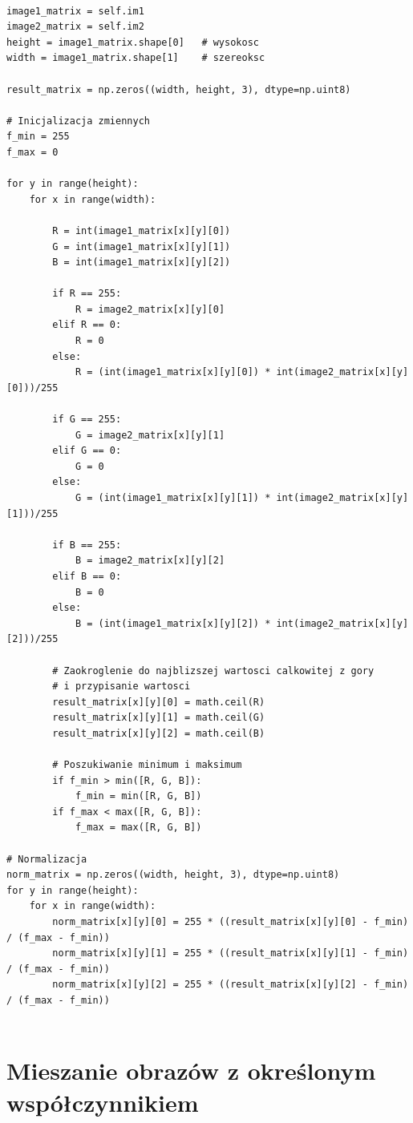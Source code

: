 \documentclass[final,a4paper,openany,12pt]{mwbk}
\begin{document}
\begin{lstlisting}[caption=Mnożenie obrazu barwowego przez inny obraz ]

image1_matrix = self.im1
image2_matrix = self.im2
height = image1_matrix.shape[0]   # wysokosc
width = image1_matrix.shape[1]    # szereoksc

result_matrix = np.zeros((width, height, 3), dtype=np.uint8)

# Inicjalizacja zmiennych
f_min = 255
f_max = 0

for y in range(height):
    for x in range(width):  

        R = int(image1_matrix[x][y][0])
        G = int(image1_matrix[x][y][1])
        B = int(image1_matrix[x][y][2])

        if R == 255:
            R = image2_matrix[x][y][0]
        elif R == 0:
            R = 0
        else:
            R = (int(image1_matrix[x][y][0]) * int(image2_matrix[x][y][0]))/255 
        
        if G == 255:
            G = image2_matrix[x][y][1]
        elif G == 0:
            G = 0
        else:
            G = (int(image1_matrix[x][y][1]) * int(image2_matrix[x][y][1]))/255 
        
        if B == 255:
            B = image2_matrix[x][y][2]
        elif B == 0:
            B = 0
        else:
            B = (int(image1_matrix[x][y][2]) * int(image2_matrix[x][y][2]))/255 

        # Zaokroglenie do najblizszej wartosci calkowitej z gory
        # i przypisanie wartosci
        result_matrix[x][y][0] = math.ceil(R)
        result_matrix[x][y][1] = math.ceil(G)
        result_matrix[x][y][2] = math.ceil(B)

        # Poszukiwanie minimum i maksimum                
        if f_min > min([R, G, B]):
            f_min = min([R, G, B])
        if f_max < max([R, G, B]):
            f_max = max([R, G, B])

# Normalizacja
norm_matrix = np.zeros((width, height, 3), dtype=np.uint8)
for y in range(height):
    for x in range(width):
        norm_matrix[x][y][0] = 255 * ((result_matrix[x][y][0] - f_min) / (f_max - f_min))
        norm_matrix[x][y][1] = 255 * ((result_matrix[x][y][1] - f_min) / (f_max - f_min))
        norm_matrix[x][y][2] = 255 * ((result_matrix[x][y][2] - f_min) / (f_max - f_min))


\end{lstlisting}


\section{ Mieszanie obrazów z określonym współczynnikiem}
\end{document}

